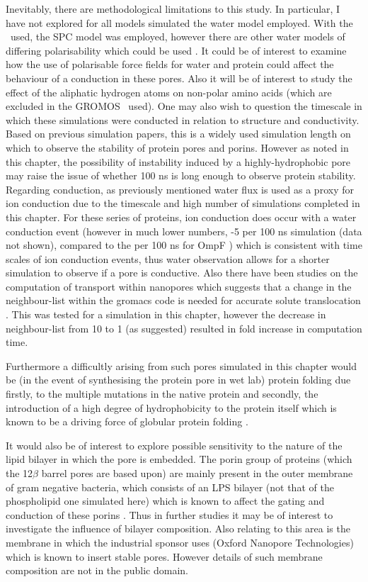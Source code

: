 Inevitably, there are methodological limitations to this study. In particular, I have not explored for all models simulated the water model employed. With the \FF\ used, the SPC model was employed, however there are other water models of differing polarisability which could be used \cite{Chaplin2001}.  It could be of interest to examine how the use of polarisable force fields \cite{Huang2014} for water and protein could affect the behaviour of a conduction in these pores. Also it will be of interest to study the effect of the aliphatic hydrogen atoms on non-polar amino acids (which are excluded in the GROMOS \FF\ used). One may also wish to question the timescale in which these simulations were conducted in relation to structure and conductivity. Based on previous simulation papers, this is a widely used simulation length on which to observe the stability of protein pores and porins. However as noted in this chapter, the possibility of instability induced by a highly-hydrophobic pore may raise the issue of whether 100 ns is long enough to observe protein stability. Regarding conduction, as previously mentioned water flux is used as a proxy for ion conduction due to the timescale and high number of simulations completed in this chapter. For these series of proteins, ion conduction does occur with a water conduction event (however in much lower numbers, -5 per 100 ns simulation (data not shown), compared to the  per 100 ns for OmpF \cite{Suenaga1998}) which is consistent with time scales of ion conduction events, thus water observation allows for a shorter simulation to observe if a pore is conductive. Also there have been studies on the computation of transport within nanopores which suggests that a change in the neighbour-list within the gromacs code is needed for accurate solute translocation \citep{Wong-Ekkabut2012}. This was tested for a simulation in this chapter, however the decrease in neighbour-list from 10 to 1 (as suggested) resulted in  fold increase in computation time. 

Furthermore a difficultly arising from such pores simulated in this chapter would be (in the event of synthesising the protein pore in wet lab) protein folding due firstly, to the multiple mutations in the native protein and secondly, the introduction of a high degree of hydrophobicity to the protein itself which is known to be a driving force of globular protein folding \cite{Pace1996}. 

It would also be of interest to explore possible sensitivity to the nature of the lipid bilayer in which the pore is embedded. The porin group of proteins (which the 12$\beta$ barrel pores are based upon) are mainly present in the outer membrane of gram negative bacteria, which consists of an LPS bilayer (not that of the phospholipid one simulated here) which is known to affect the gating and conduction of these porins \cite{Zeth2000}. Thus in further studies it may be of interest to investigate the influence of bilayer composition. Also relating to this area is the membrane in which the industrial sponsor uses (Oxford Nanopore Technologies) which is known to insert stable pores. However details of such membrane composition are not in the public domain. 
